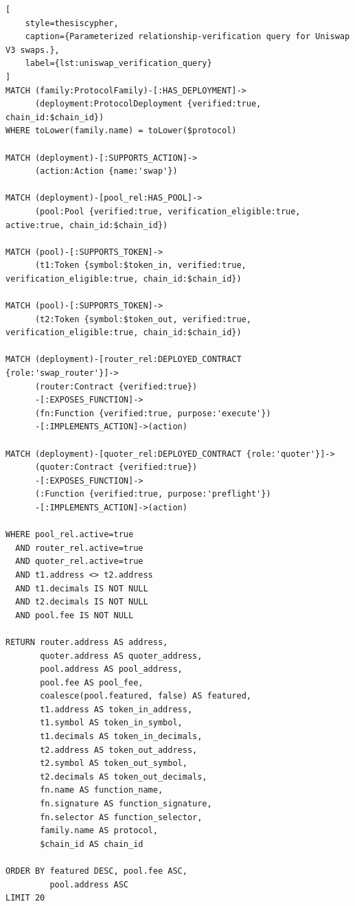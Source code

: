 \begin{lstlisting}[
    style=thesiscypher,
    caption={Parameterized relationship-verification query for Uniswap V3 swaps.},
    label={lst:uniswap_verification_query}
]
MATCH (family:ProtocolFamily)-[:HAS_DEPLOYMENT]->
      (deployment:ProtocolDeployment {verified:true, chain_id:$chain_id})
WHERE toLower(family.name) = toLower($protocol)

MATCH (deployment)-[:SUPPORTS_ACTION]->
      (action:Action {name:'swap'})

MATCH (deployment)-[pool_rel:HAS_POOL]->
      (pool:Pool {verified:true, verification_eligible:true, active:true, chain_id:$chain_id})

MATCH (pool)-[:SUPPORTS_TOKEN]->
      (t1:Token {symbol:$token_in, verified:true, verification_eligible:true, chain_id:$chain_id})

MATCH (pool)-[:SUPPORTS_TOKEN]->
      (t2:Token {symbol:$token_out, verified:true, verification_eligible:true, chain_id:$chain_id})

MATCH (deployment)-[router_rel:DEPLOYED_CONTRACT {role:'swap_router'}]->
      (router:Contract {verified:true})
      -[:EXPOSES_FUNCTION]->
      (fn:Function {verified:true, purpose:'execute'})
      -[:IMPLEMENTS_ACTION]->(action)

MATCH (deployment)-[quoter_rel:DEPLOYED_CONTRACT {role:'quoter'}]->
      (quoter:Contract {verified:true})
      -[:EXPOSES_FUNCTION]->
      (:Function {verified:true, purpose:'preflight'})
      -[:IMPLEMENTS_ACTION]->(action)

WHERE pool_rel.active=true
  AND router_rel.active=true
  AND quoter_rel.active=true
  AND t1.address <> t2.address
  AND t1.decimals IS NOT NULL
  AND t2.decimals IS NOT NULL
  AND pool.fee IS NOT NULL

RETURN router.address AS address,
       quoter.address AS quoter_address,
       pool.address AS pool_address,
       pool.fee AS pool_fee,
       coalesce(pool.featured, false) AS featured,
       t1.address AS token_in_address,
       t1.symbol AS token_in_symbol,
       t1.decimals AS token_in_decimals,
       t2.address AS token_out_address,
       t2.symbol AS token_out_symbol,
       t2.decimals AS token_out_decimals,
       fn.name AS function_name,
       fn.signature AS function_signature,
       fn.selector AS function_selector,
       family.name AS protocol,
       $chain_id AS chain_id

ORDER BY featured DESC, pool.fee ASC,
         pool.address ASC
LIMIT 20
\end{lstlisting}

